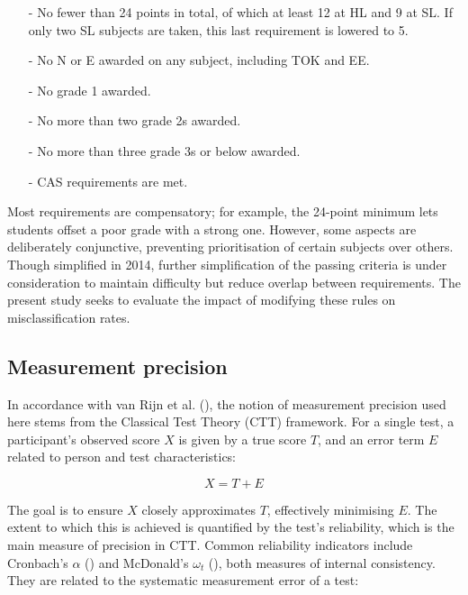 \documentclass[12pt]{article}
\begin{document}
\begin{itemize}[itemsep=0pt, parsep=0pt]
    \item[-] No fewer than 24 points in total, of which at least 12 at HL and 9 at SL. If only two SL subjects are taken, this last requirement is lowered to 5.
    \item[-] No N or E awarded on any subject, including TOK and EE.
    \item[-] No grade 1 awarded.
    \item[-] No more than two grade 2s awarded.
    \item[-] No more than three grade 3s or below awarded.
    \item[-] CAS requirements are met.
\end{itemize}

Most requirements are compensatory; for example, the 24-point minimum lets students offset a poor grade with a strong one. However, some aspects are deliberately conjunctive, preventing prioritisation of certain subjects over others. Though simplified in 2014, further simplification of the passing criteria is under consideration to maintain difficulty but reduce overlap between requirements. The present study seeks to evaluate the impact of modifying these rules on misclassification rates.

\subsection{Measurement precision}

In accordance with van Rijn et al. (\cite*{rijnEducationalMeasurementIssues2014}), the notion of measurement precision used here stems from the Classical Test Theory (CTT) framework. For a single test, a participant's observed score $X$ is given by a true score $T$, and an error term $E$ related to person and test characteristics:

\begin{equation}
\label{eqn:obstrue}
    X=T+E
\end{equation}

The goal is to ensure $X$ closely approximates $T$, effectively minimising $E$. The extent to which this is achieved is quantified by the test's reliability, which is the main measure of precision in CTT. Common reliability indicators include Cronbach's $\alpha$ (\cite{cronbachCoefficientAlphaInternal1951}) and McDonald's $\omega_t$ (\cite{mcdonaldTestTheoryUnified1999}), both measures of internal consistency. They are related to the systematic measurement error of a test:
\end{document}
